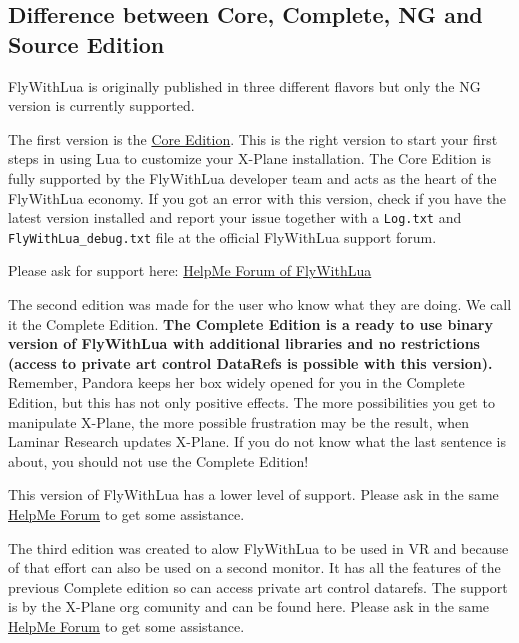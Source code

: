 \documentclass[11pt,parskip=half,a4paper]{scrartcl}
\begin{document}
\newpage
\subsection{Difference between Core, Complete, NG and Source Edition}

FlyWithLua is originally published in three different flavors but only the NG version is currently supported.

The first version is the \href{http://forums.x-plane.org/index.php?/files/file/35579-flywithlua-core-edition-for-x-plane-11-windows-linux-mac-os-x-version/}{Core Edition}. This is the right version to start your first steps in using Lua to customize your X-Plane installation. The Core Edition is fully supported by the FlyWithLua developer team and acts as the heart of the FlyWithLua economy. If you got an error with this version, check if you have the latest version installed and report your issue together with a \verb|Log.txt| and \verb|FlyWithLua_debug.txt| file at the official FlyWithLua support forum.

Please ask for support here: \href{http://forums.x-plane.org/index.php?/forums/forum/335-help-me-i-have-a-problem-with-flywithlua/}{HelpMe Forum of FlyWithLua}

The second edition was made for the user who know what they are doing. We call it the Complete Edition. \textbf{The Complete Edition is a ready to use binary version of FlyWithLua with additional libraries and no restrictions (access to private art control DataRefs is possible with this version).} Remember, Pandora keeps her box widely opened for you in the Complete Edition, but this has not only positive effects. The more possibilities you get to manipulate X-Plane, the more possible frustration may be the result, when Laminar Research updates X-Plane. If you do not know what the last sentence is about, you should not use the Complete Edition!

This version of FlyWithLua has a lower level of support. Please ask in the same \href{http://forums.x-plane.org/index.php?/forums/forum/335-help-me-i-have-a-problem-with-flywithlua/}{HelpMe Forum} to get some assistance.

The third edition was created to alow FlyWithLua to be used in VR and because of that effort can also be used on a second monitor. It has all the features of the previous Complete edition so can access private art control datarefs. The support is by the X-Plane org comunity and can be found here. Please ask in the same \href{http://forums.x-plane.org/index.php?/forums/forum/335-help-me-i-have-a-problem-with-flywithlua/}{HelpMe Forum} to get some assistance. 
\end{document}
